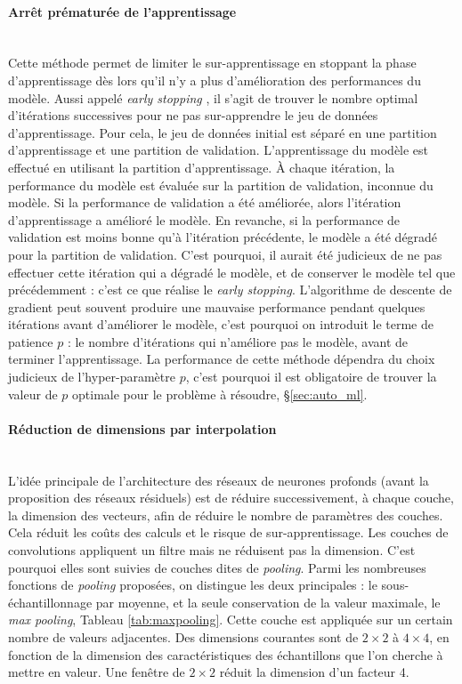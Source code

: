\paragraph{Arrêt prématurée de l'apprentissage}\mbox{} \label{parag:early_stopping} \\
Cette méthode permet de limiter le sur-apprentissage en stoppant la phase d'apprentissage dès lors qu'il n'y a plus d'amélioration des performances du modèle.
Aussi appelé \textit{early stopping} \cite{yao_early_2007}, il s'agit de trouver le nombre optimal d'itérations successives pour ne pas sur-apprendre le jeu de données d'apprentissage.
Pour cela, le jeu de données initial est séparé en une partition d'apprentissage et une partition de validation.
L'apprentissage du modèle est effectué en utilisant la partition d'apprentissage.
À chaque itération, la performance du modèle est évaluée sur la partition de validation, inconnue du modèle.
Si la performance de validation a été améliorée, alors l'itération d'apprentissage a amélioré le modèle.
En revanche, si la performance de validation est moins bonne qu'à l'itération précédente, le modèle a été dégradé pour la partition de validation.
C'est pourquoi, il aurait été judicieux de ne pas effectuer cette itération qui a dégradé le modèle, et de conserver le modèle tel que précédemment : c'est ce que réalise le \textit{early stopping}.
L'algorithme de descente de gradient peut souvent produire une mauvaise performance pendant quelques itérations avant d'améliorer le modèle, c'est pourquoi on introduit le terme de patience $p$ : le nombre d'itérations qui n'améliore pas le modèle, avant de terminer l'apprentissage.
La performance de cette méthode dépendra du choix judicieux de l'hyper-paramètre $p$, c'est pourquoi il est obligatoire de trouver la valeur de $p$ optimale pour le problème à résoudre, §\ref{sec:auto_ml}.

\paragraph{Réduction de dimensions par interpolation}\mbox{} \label{parag:pooling} \\
L'idée principale de l'architecture des réseaux de neurones profonds (avant la proposition des réseaux résiduels) est de réduire successivement, à chaque couche, la dimension des vecteurs, afin de réduire le nombre de paramètres des couches. Cela réduit les coûts des calculs et le risque de sur-apprentissage.
Les couches de convolutions appliquent un filtre mais ne réduisent pas la dimension.
C'est pourquoi elles sont suivies de couches dites de \textit{pooling}. Parmi les nombreuses fonctions de \textit{pooling} proposées, on distingue les deux principales : le sous-échantillonnage par moyenne, et la seule conservation de la valeur maximale, le \textit{max pooling}, Tableau \ref{tab:maxpooling}.
Cette couche est appliquée sur un certain nombre de valeurs adjacentes.
Des dimensions courantes sont de $2 \times 2$ à $4 \times 4$, en fonction de la dimension des caractéristiques des échantillons que l'on cherche à mettre en valeur.
Une fenêtre de $2 \times 2$ réduit la dimension d'un facteur 4.

